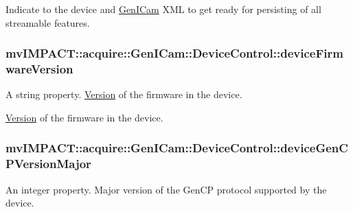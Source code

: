 Indicate to the device and \hyperlink{namespacemv_i_m_p_a_c_t_1_1acquire_1_1_gen_i_cam}{Gen\+I\+Cam} X\+M\+L to get ready for persisting of all streamable features. \hypertarget{classmv_i_m_p_a_c_t_1_1acquire_1_1_gen_i_cam_1_1_device_control_a411bf0b0af1108fc95d2670a73c1387c}{
\subsubsection[{device\+Firmware\+Version}]{ mv\+I\+M\+P\+A\+C\+T\+::acquire\+::\+Gen\+I\+Cam\+::\+Device\+Control\+::device\+Firmware\+Version}}\label{classmv_i_m_p_a_c_t_1_1acquire_1_1_gen_i_cam_1_1_device_control_a411bf0b0af1108fc95d2670a73c1387c}


A string property. \hyperlink{struct_version}{Version} of the firmware in the device. 

\hyperlink{struct_version}{Version} of the firmware in the device. \hypertarget{classmv_i_m_p_a_c_t_1_1acquire_1_1_gen_i_cam_1_1_device_control_a1694f3b88bad5801fd2e020a025f22b6}{
\subsubsection[{device\+Gen\+C\+P\+Version\+Major}]{ mv\+I\+M\+P\+A\+C\+T\+::acquire\+::\+Gen\+I\+Cam\+::\+Device\+Control\+::device\+Gen\+C\+P\+Version\+Major}}\label{classmv_i_m_p_a_c_t_1_1acquire_1_1_gen_i_cam_1_1_device_control_a1694f3b88bad5801fd2e020a025f22b6}


An integer property. Major version of the Gen\+C\+P protocol supported by the device. 

